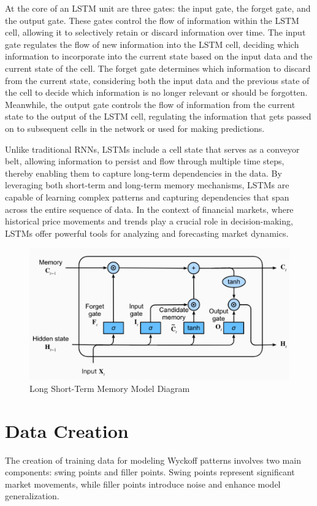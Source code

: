 \documentclass{article}
\begin{document}
At the core of an LSTM unit are three gates: the input gate, the forget gate, and the output gate. These gates control the flow of information within the LSTM cell, allowing it to selectively retain or discard information over time. The input gate regulates the flow of new information into the LSTM cell, deciding which information to incorporate into the current state based on the input data and the current state of the cell. The forget gate determines which information to discard from the current state, considering both the input data and the previous state of the cell to decide which information is no longer relevant or should be forgotten. Meanwhile, the output gate controls the flow of information from the current state to the output of the LSTM cell, regulating the information that gets passed on to subsequent cells in the network or used for making predictions. 

Unlike traditional RNNs, LSTMs include a cell state that serves as a conveyor belt, allowing information to persist and flow through multiple time steps, thereby enabling them to capture long-term dependencies in the data. By leveraging both short-term and long-term memory mechanisms, LSTMs are capable of learning complex patterns and capturing dependencies that span across the entire sequence of data. In the context of financial markets, where historical price movements and trends play a crucial role in decision-making, LSTMs offer powerful tools for analyzing and forecasting market dynamics.


\begin{figure}[ht]
	\centering
	\includegraphics[width=0.7\linewidth]{visuals/lstm_model}
	\caption{Long Short-Term Memory Model Diagram}
	\label{fig:lstmmodel}
\end{figure}
\clearpage
\section{Data Creation}
The creation of training data for modeling Wyckoff patterns involves two main components: swing points and filler points. Swing points represent significant market movements, while filler points introduce noise and enhance model generalization.
\end{document}
